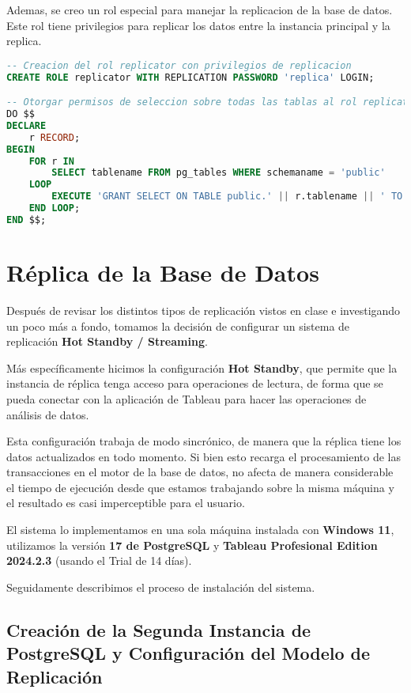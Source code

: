 \documentclass{article}
\begin{document}
Ademas, se creo un rol especial para manejar la replicacion de la base de datos. Este rol tiene privilegios para replicar los datos entre la instancia principal y la replica.

\begin{lstlisting}[language=SQL]
-- Creacion del rol replicator con privilegios de replicacion
CREATE ROLE replicator WITH REPLICATION PASSWORD 'replica' LOGIN;

-- Otorgar permisos de seleccion sobre todas las tablas al rol replicator
DO $$ 
DECLARE
    r RECORD;
BEGIN
    FOR r IN 
        SELECT tablename FROM pg_tables WHERE schemaname = 'public' 
    LOOP
        EXECUTE 'GRANT SELECT ON TABLE public.' || r.tablename || ' TO replicator;';
    END LOOP;
END $$;
\end{lstlisting}

\newpage
\section{Réplica de la Base de Datos}

Después de revisar los distintos tipos de replicación vistos en clase e investigando un poco más a fondo, tomamos la decisión de configurar un sistema de replicación \textbf{Hot Standby / Streaming}.

Más específicamente hicimos la configuración \textbf{Hot Standby}, que permite que la instancia de réplica tenga acceso para operaciones de lectura, de forma que se pueda conectar con la aplicación de Tableau para hacer las operaciones de análisis de datos.

Esta configuración trabaja de modo sincrónico, de manera que la réplica tiene los datos actualizados en todo momento. Si bien esto recarga el procesamiento de las transacciones en el motor de la base de datos, no afecta de manera considerable el tiempo de ejecución desde que estamos trabajando sobre la misma máquina y el resultado es casi imperceptible para el usuario.

El sistema lo implementamos en una sola máquina instalada con \textbf{Windows 11}, utilizamos la versión \textbf{17 de PostgreSQL} y \textbf{Tableau Profesional Edition 2024.2.3} (usando el Trial de 14 días).

Seguidamente describimos el proceso de instalación del sistema.

\subsection{Creación de la Segunda Instancia de PostgreSQL y Configuración del Modelo de Replicación}
\end{document}
